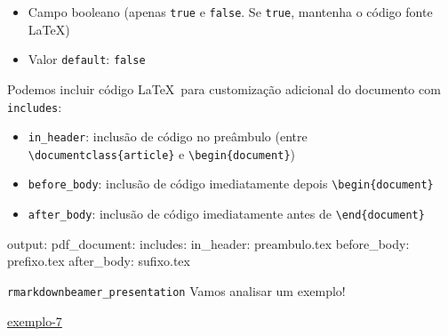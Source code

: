 \documentclass[
  10pt,
  ignorenonframetext,
]{beamer}
\newenvironment{Shaded}{\begin{snugshade}}{\end{snugshade}}
\newcommand{\AttributeTok}[1]{\textcolor[rgb]{0.40,0.45,0.13}{#1}}
\newcommand{\FunctionTok}[1]{\textcolor[rgb]{0.28,0.35,0.67}{#1}}
\newcommand{\KeywordTok}[1]{\textcolor[rgb]{0.00,0.23,0.31}{#1}}
\providecommand{\tightlist}{%
  \setlength{\itemsep}{0pt}\setlength{\parskip}{0pt}}\usepackage{longtable,booktabs,array}
\begin{document}
\begin{frame}[fragile]
\begin{itemize}
  \begin{itemize}
  \tightlist
  \item
    Campo booleano (apenas \texttt{true} e \texttt{false}. Se
    \texttt{true}, mantenha o código fonte \LaTeX)
  \item
    Valor \texttt{default}: \texttt{false}
  \end{itemize}
\end{itemize}
\end{frame}

\begin{frame}[fragile]
Podemos incluir código \LaTeX~para customização adicional do documento
com \texttt{includes}:

\begin{itemize}
\tightlist
\item
  \texttt{in\_header}: inclusão de código no preâmbulo (entre
  \texttt{\textbackslash{}documentclass\{article\}} e
  \texttt{\textbackslash{}begin\{document\}})
\item
  \texttt{before\_body}: inclusão de código imediatamente depois
  \texttt{\textbackslash{}begin\{document\}}
\item
  \texttt{after\_body}: inclusão de código imediatamente antes de
  \texttt{\textbackslash{}end\{document\}}
\end{itemize}

\begin{Shaded}
\begin{Highlighting}[]
\FunctionTok{output}\KeywordTok{:}
\AttributeTok{  }\FunctionTok{pdf\_document}\KeywordTok{:}
\AttributeTok{    }\FunctionTok{includes}\KeywordTok{:}
\AttributeTok{      }\FunctionTok{in\_header}\KeywordTok{:}\AttributeTok{ preambulo.tex}
\AttributeTok{      }\FunctionTok{before\_body}\KeywordTok{:}\AttributeTok{ prefixo.tex}
\AttributeTok{      }\FunctionTok{after\_body}\KeywordTok{:}\AttributeTok{ sufixo.tex}
\end{Highlighting}
\end{Shaded}
\end{frame}

\begin{frame}{\texttt{rmarkdown}\newline \texttt{beamer\_presentation}}
\protect\hypertarget{rmarkdownbeamer_presentation-2}{}
Vamos analisar um exemplo!

\href{https://ufbabr-my.sharepoint.com/:f:/g/personal/gilberto_sassi_ufba_br/EilR6FOzfwpNgwv6lL-klfgBMqkuoVWymd1TudVNmvlXKg?e=KqhfR9}{exemplo-7}
\end{frame}
\end{document}
